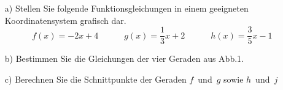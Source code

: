 



	\begin{itemize}
		\item[a)] Stellen Sie folgende Funktionsgleichungen in einem geeigneten Koordinatensystem grafisch dar.
		\begin{equation*}
			f(x) = -2x + 4 \qquad \quad g(x) = \frac{1}{3}x + 2 \quad \qquad h(x) = \frac{3}{5}x - 1
		\end{equation*}
		\item[b)] Bestimmen Sie die Gleichungen der vier Geraden aus Abb.1.
		\item[c)] Berechnen Sie die Schnittpunkte der Geraden $f$~und~$g$ sowie $h$~und~$j$
	\end{itemize}
